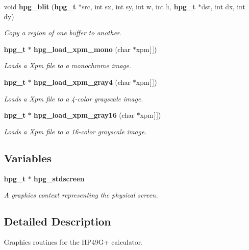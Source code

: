 \begin{CompactItemize}
void {\bf hpg\_\-blit} ({\bf hpg\_\-t} $\ast$src, int sx, int sy, int w, int h, {\bf hpg\_\-t} $\ast$dst, int dx, int dy)
\begin{CompactList}\small\item\em Copy a region of one buffer to another.\item\end{CompactList}\item 
{\bf hpg\_\-t} $\ast$ {\bf hpg\_\-load\_\-xpm\_\-mono} (char $\ast$xpm[$\,$])
\begin{CompactList}\small\item\em Loads a Xpm file to a monochrome image.\item\end{CompactList}\item 
{\bf hpg\_\-t} $\ast$ {\bf hpg\_\-load\_\-xpm\_\-gray4} (char $\ast$xpm[$\,$])
\begin{CompactList}\small\item\em Loads a Xpm file to a 4-color grayscale image.\item\end{CompactList}\item 
{\bf hpg\_\-t} $\ast$ {\bf hpg\_\-load\_\-xpm\_\-gray16} (char $\ast$xpm[$\,$])
\begin{CompactList}\small\item\em Loads a Xpm file to a 16-color grayscale image.\item\end{CompactList}\end{CompactItemize}
\subsection*{Variables}
\begin{CompactItemize}
\item 
{\bf hpg\_\-t} $\ast$ {\bf hpg\_\-stdscreen}
\begin{CompactList}\small\item\em A graphics context representing the physical screen.\item\end{CompactList}\end{CompactItemize}


\subsection{Detailed Description}
Graphics routines for the HP49G+ calculator.





